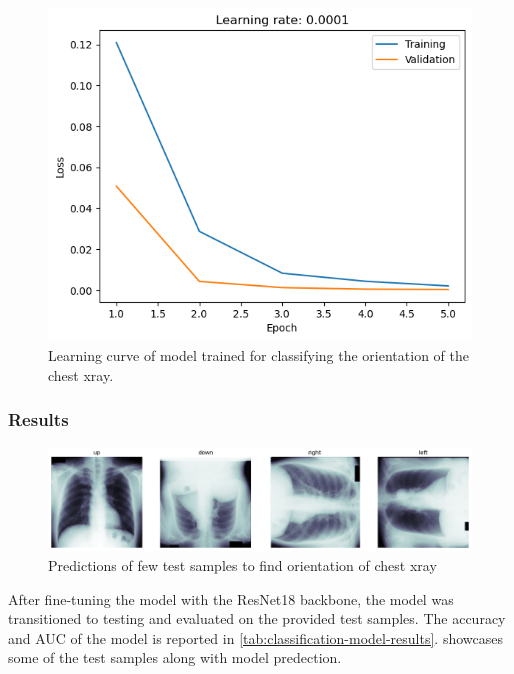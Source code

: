     \begin{figure}[htbp]
        \centering
        \includegraphics[width=\linewidth]{../plots/orientation/learning-0.0001-adam.png}
        \caption{Learning curve of model trained for classifying the orientation of the chest xray.}
        \label{fig:orientation-learning-curve}
    \end{figure}

\subsubsection{Results}

    \begin{figure}[!htbp]
        \centering
        \includegraphics[width=\linewidth]{../plots/orientation/result.png}
        \caption{Predictions of few test samples to find orientation of chest xray}
        \label{fig:orientation-results}
    \end{figure} 

    After fine-tuning the model with the ResNet18 backbone, the model was transitioned to testing and evaluated on the provided test samples. The accuracy and AUC of the model is reported in \cref{tab:classification-model-results}.  showcases some of the test samples along with model predection.
